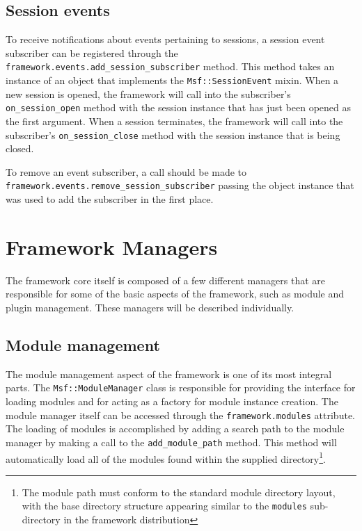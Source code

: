 \documentclass{report}
\begin{document}
        \subsection{Session events}

\par
To receive notifications about events pertaining to sessions, a
session event subscriber can be registered through the
\texttt{framework.events.add\_session\_subscriber} method.  This
method takes an instance of an object that implements the
\texttt{Msf::SessionEvent} mixin.  When a new session is opened, the
framework will call into the subscriber's \texttt{on\_session\_open}
method with the session instance that has just been opened as the
first argument.  When a session terminates, the framework will call
into the subscriber's \texttt{on\_session\_close} method with the
session instance that is being closed.

\par
To remove an event subscriber, a call should be made to\\
\texttt{framework.events.remove\_session\_subscriber} passing the
object instance that was used to add the subscriber in the first
place.

    \section{Framework Managers}

\par
The framework core itself is composed of a few different managers
that are responsible for some of the basic aspects of the framework,
such as module and plugin management.  These managers will be
described individually.

        \subsection{Module management}

\par
The module management aspect of the framework is one of its most
integral parts.  The \texttt{Msf::ModuleManager} class is
responsible for providing the interface for loading modules and for
acting as a factory for module instance creation.  The module
manager itself can be accessed through the
\texttt{framework.modules} attribute.  The loading of modules is
accomplished by adding a search path to the module manager by making
a call to the \texttt{add\_module\_path} method.  This method will
automatically load all of the modules found within the supplied
directory\footnote{The module path must conform to the standard
module directory layout, with the base directory structure appearing
similar to the \texttt{modules} sub-directory in the framework
distribution}.
\end{document}

